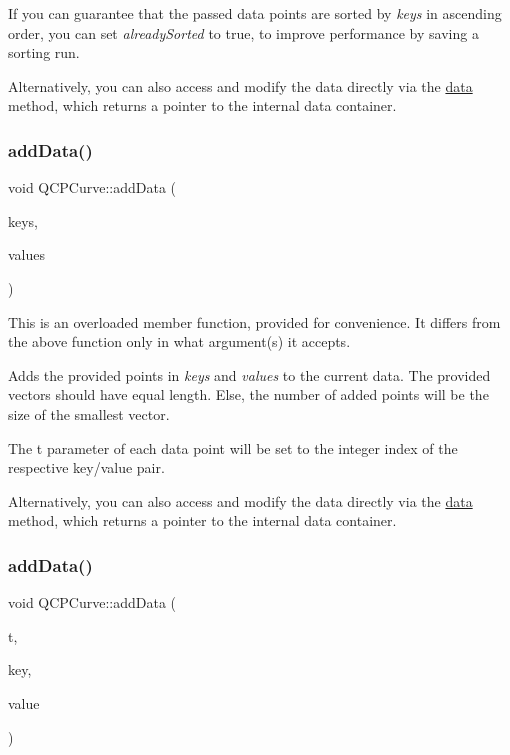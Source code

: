 If you can guarantee that the passed data points are sorted by {\itshape keys} in ascending order, you can set {\itshape already\+Sorted} to true, to improve performance by saving a sorting run.

Alternatively, you can also access and modify the data directly via the \hyperlink{classQCPCurve_a761492fd00b1ab7cb18ce23c118c6c60}{data} method, which returns a pointer to the internal data container. \mbox{\label{classQCPCurve_a6424fa06da1786648c83ad13a0d0aa14}} 
\subsubsection{\texorpdfstring{add\+Data()}{addData()}\hspace{0.1cm}{\footnotesize\ttfamily [2/4]}}
{\footnotesize\ttfamily void Q\+C\+P\+Curve\+::add\+Data (\begin{DoxyParamCaption}\item[{const Q\+Vector$<$ double $>$ \&}]{keys,  }\item[{const Q\+Vector$<$ double $>$ \&}]{values }\end{DoxyParamCaption})}

This is an overloaded member function, provided for convenience. It differs from the above function only in what argument(s) it accepts.

Adds the provided points in {\itshape keys} and {\itshape values} to the current data. The provided vectors should have equal length. Else, the number of added points will be the size of the smallest vector.

The t parameter of each data point will be set to the integer index of the respective key/value pair.

Alternatively, you can also access and modify the data directly via the \hyperlink{classQCPCurve_a761492fd00b1ab7cb18ce23c118c6c60}{data} method, which returns a pointer to the internal data container. \mbox{\label{classQCPCurve_a13398b236f6926014e404eeb5b9f415c}} 
\subsubsection{\texorpdfstring{add\+Data()}{addData()}\hspace{0.1cm}{\footnotesize\ttfamily [3/4]}}
{\footnotesize\ttfamily void Q\+C\+P\+Curve\+::add\+Data (\begin{DoxyParamCaption}\item[{double}]{t,  }\item[{double}]{key,  }\item[{double}]{value }\end{DoxyParamCaption})}

